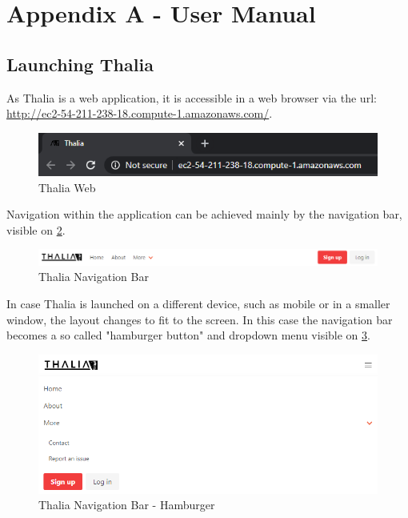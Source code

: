 \documentclass[main.tex]{subfiles}
\begin{document}
\section{Appendix A - User Manual}
\label{user_manual}
\subsection{Launching Thalia}
As Thalia is a web application, it is accessible in a web browser via the url: \url{http://ec2-54-211-238-18.compute-1.amazonaws.com/}.

\begin{figure}[H]
   \centering
   \includegraphics[scale=0.8]{10Appendices/081User/081Pictures/thalia_domain.png}
   \caption{Thalia Web}
   \label{thalia_web}
\end{figure}

Navigation within the application can be achieved mainly by the navigation bar, visible on \figurename{\ref{thalia_navbar}}.

\begin{figure}[H]
   \centering
   \includegraphics[width=\textwidth]{10Appendices/081User/081Pictures/navbar.png}
   \caption{Thalia Navigation Bar}
   \label{thalia_navbar}
\end{figure}

In case Thalia is launched on a different device, such as mobile or in a smaller window, the layout changes to fit to the screen. In this case the navigation bar becomes a so called "hamburger button" and dropdown menu visible on \figurename{\ref{thalia_navbar_hamburger}}.

\begin{figure}[H]
   \centering
   \includegraphics[width=\textwidth]{10Appendices/081User/081Pictures/navbar_hamburger.png}
   \caption{Thalia Navigation Bar - Hamburger}
   \label{thalia_navbar_hamburger}
\end{figure}
\end{document}
